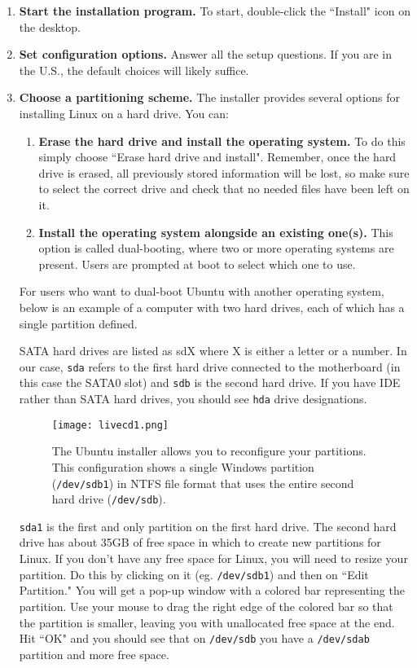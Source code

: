 \begin{enumerate}
\item \textbf{Start the installation program.} To start, double-click the ``Install" icon on the desktop.

\item \textbf{Set configuration options.} Answer all the setup questions. If you are in the U.S., the default choices will likely suffice. 

\item \textbf{Choose a partitioning scheme.} The installer provides several options for installing Linux on a hard drive. You can:
	\begin{enumerate}
	\item \textbf{Erase the hard drive and install the operating system.} To do this simply choose ``Erase hard drive and install". Remember, once the hard drive is erased, all previously stored information will be lost, so make sure to select the correct drive and check that no needed files have been left on it. 
	\item \textbf{Install the operating system alongside an existing one(s).} This option is called dual-booting, where two or more operating systems are present. Users are prompted at boot to select which one to use. 
	\end{enumerate}

For users who want to dual-boot Ubuntu with another operating system, below is an example of a computer with two hard drives, each of which has a single partition defined. 

SATA hard drives are listed as sdX where X is either a letter or a number. In our case, \texttt{sda} refers to the first hard drive connected to the motherboard (in this case the SATA0 slot) and \texttt{sdb} is the second hard drive. If you have IDE rather than SATA hard drives, you should see \texttt{hda} drive designations. 

\begin{figure}[h]
\begin{center}
\texttt{[image: livecd1.png]} 
\caption[Ubuntu Installation: Preparing your partitions]{The Ubuntu installer allows you to reconfigure your partitions. This configuration shows a single Windows partition (\texttt{/dev/sdb1}) in NTFS file format that uses the entire second hard drive (\texttt{/dev/sdb}).} 
\end{center}
\end{figure}

\texttt{sda1} is the first and only partition on the first hard drive. The second hard drive has about 35GB of free space in which to create new partitions for Linux. If you don't have any free space for Linux, you will need to resize your partition. Do this by clicking on it (eg. \texttt{/dev/sdb1}) and then on ``Edit Partition." You will get a pop-up window with a colored bar representing the partition. Use your mouse to drag the right edge of the colored bar so that the partition is smaller, leaving you with unallocated free space at the end. Hit ``OK" and you should see that on \texttt{/dev/sdb} you have a \texttt{/dev/sdab} partition and more free space.


\end{enumerate}
